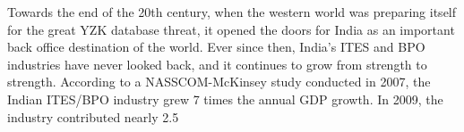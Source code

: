 Towards the end of the 20th century, when the western world was preparing itself for the great YZK database threat, it opened the doors for India as an important back office destination of the world. Ever since then, India's ITES and BPO industries  have never looked back, and it continues to grow from strength to strength. According to a NASSCOM-McKinsey study  conducted in 2007, the Indian ITES/BPO industry grew 7 times the annual GDP growth. In 2009, the industry contributed nearly 2.5%

    